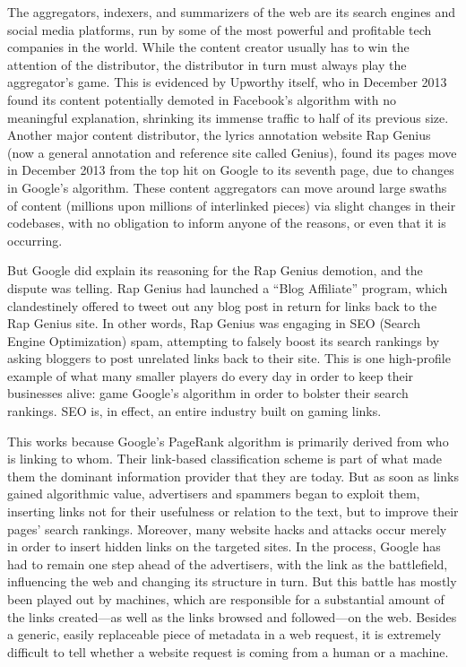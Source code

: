 The aggregators, indexers, and summarizers of the web are its search engines and social media platforms, run by some of the most powerful and profitable tech companies in the world. While the content creator usually has to win the attention of the distributor, the distributor in turn must always play the aggregator's game. This is evidenced by Upworthy itself, who in December 2013 found its content potentially demoted in Facebook's algorithm with no meaningful explanation, shrinking its immense traffic to half of its previous size.\autocite{carlson_upworthy_2014} Another major content distributor, the lyrics annotation website Rap Genius (now a general annotation and reference site called Genius), found its pages move in December 2013 from the top hit on Google to its seventh page, due to changes in Google's algorithm.\autocite{constine_google_2013} These content aggregators can move around large swaths of content (millions upon millions of interlinked pieces) via slight changes in their codebases, with no obligation to inform anyone of the reasons, or even that it is occurring.

But Google did explain its reasoning for the Rap Genius demotion, and the dispute was telling. Rap Genius had launched a ``Blog Affiliate'' program, which clandestinely offered to tweet out any blog post in return for links back to the Rap Genius site. In other words, Rap Genius was engaging in SEO (Search Engine Optimization) spam, attempting to falsely boost its search rankings by asking bloggers to post unrelated links back to their site. This is one high-profile example of what many smaller players do every day in order to keep their businesses alive: game Google's algorithm in order to bolster their search rankings. SEO is, in effect, an entire industry built on gaming links.

This works because Google's PageRank algorithm is primarily derived from who is linking to whom. Their link-based classification scheme is part of what made them the dominant information provider that they are today. But as soon as links gained algorithmic value, advertisers and spammers began to exploit them, inserting links not for their usefulness or relation to the text, but to improve their pages' search rankings. Moreover, many website hacks and attacks occur merely in order to insert hidden links on the targeted sites. In the process, Google has had to remain one step ahead of the advertisers, with the link as the battlefield, influencing the web and changing its structure in turn. But this battle has mostly been played out by machines, which are responsible for a substantial amount of the links created---as well as the links browsed and followed---on the web. Besides a generic, easily replaceable piece of metadata in a web request, it is extremely difficult to tell whether a website request is coming from a human or a machine.

